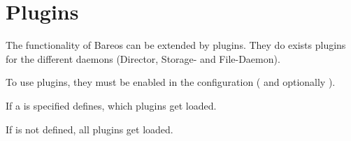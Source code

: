 \chapter{Plugins}
\label{sec:plugins}

The functionality of Bareos can be extended by plugins.
They do exists plugins for the different daemons (Director, Storage- and File-Daemon).

To use plugins, they must be enabled in the configuration ( and optionally ).

If a  is specified
 defines, which plugins get loaded.

If  is not defined, all plugins get loaded.



  


